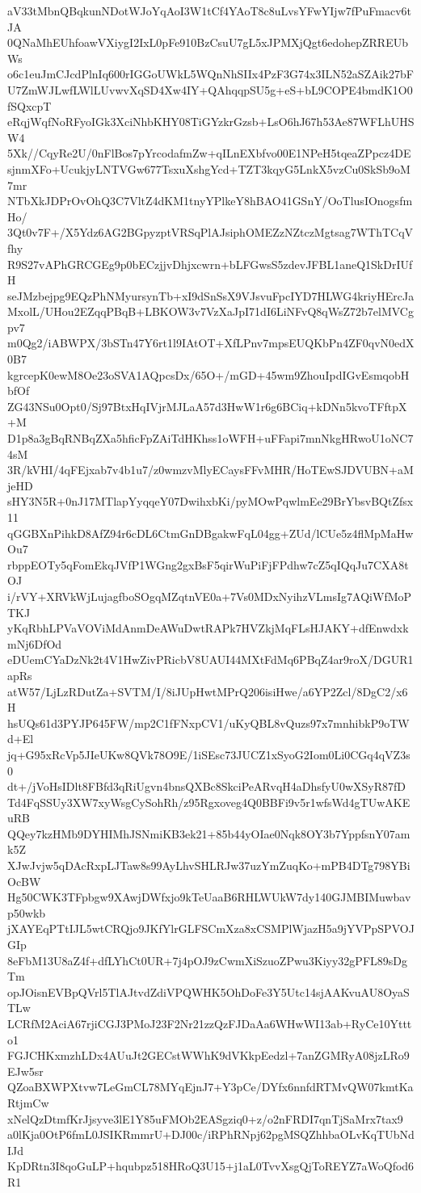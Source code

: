 aV33tMbnQBqkunNDotWJoYqAoI3W1tCf4YAoT8c8uLvsYFwYIjw7fPuFmacv6tJA
0QNaMhEUhfoawVXiygI2IxL0pFe910BzCsuU7gL5xJPMXjQgt6edohepZRREUbWs
o6c1euJmCJcdPlnIq600rIGGoUWkL5WQnNhSIIx4PzF3G74x3ILN52aSZAik27bF
U7ZmWJLwfLWlLUvwvXqSD4Xw4IY+QAhqqpSU5g+eS+bL9COPE4bmdK1O0fSQxcpT
eRqjWqfNoRFyoIGk3XciNhbKHY08TiGYzkrGzsb+LsO6hJ67h53Ae87WFLhUHSW4
5Xk//CqyRe2U/0nFlBos7pYrcodafmZw+qILnEXbfvo00E1NPeH5tqeaZPpcz4DE
sjnmXFo+UcukjyLNTVGw677TsxuXshgYcd+TZT3kqyG5LnkX5vzCu0SkSb9oM7mr
NTbXkJDPrOvOhQ3C7VltZ4dKM1tnyYPlkeY8hBAO41GSnY/OoTlusIOnogsfmHo/
3Qt0v7F+/X5Ydz6AG2BGpyzptVRSqPlAJsiphOMEZzNZtczMgtsag7WThTCqVfhy
R9S27vAPhGRCGEg9p0bECzjjvDhjxcwrn+bLFGwsS5zdevJFBL1aneQ1SkDrIUfH
seJMzbejpg9EQzPhNMyursynTb+xI9dSnSsX9VJsvuFpcIYD7HLWG4kriyHErcJa
MxolL/UHou2EZqqPBqB+LBKOW3v7VzXaJpI71dI6LiNFvQ8qWsZ72b7elMVCgpv7
m0Qg2/iABWPX/3bSTn47Y6rt1l9IAtOT+XfLPnv7mpsEUQKbPn4ZF0qvN0edX0B7
kgrcepK0ewM8Oe23oSVA1AQpcsDx/65O+/mGD+45wm9ZhouIpdIGvEsmqobHbfOf
ZG43NSu0Opt0/Sj97BtxHqIVjrMJLaA57d3HwW1r6g6BCiq+kDNn5kvoTFftpX+M
D1p8a3gBqRNBqZXa5hficFpZAiTdHKhss1oWFH+uFFapi7mnNkgHRwoU1oNC74sM
3R/kVHI/4qFEjxab7v4b1u7/z0wmzvMlyECaysFFvMHR/HoTEwSJDVUBN+aMjeHD
sHY3N5R+0nJ17MTlapYyqqeY07DwihxbKi/pyMOwPqwlmEe29BrYbsvBQtZfsx11
qGGBXnPihkD8AfZ94r6cDL6CtmGnDBgakwFqL04gg+ZUd/lCUe5z4flMpMaHwOu7
rbppEOTy5qFomEkqJVfP1WGng2gxBsF5qirWuPiFjFPdhw7cZ5qIQqJu7CXA8tOJ
i/rVY+XRVkWjLujagfboSOgqMZqtnVE0a+7Vs0MDxNyihzVLmsIg7AQiWfMoPTKJ
yKqRbhLPVaVOViMdAnmDeAWuDwtRAPk7HVZkjMqFLsHJAKY+dfEnwdxkmNj6DfOd
eDUemCYaDzNk2t4V1HwZivPRicbV8UAUI44MXtFdMq6PBqZ4ar9roX/DGUR1apRs
atW57/LjLzRDutZa+SVTM/I/8iJUpHwtMPrQ206isiHwe/a6YP2Zcl/8DgC2/x6H
hsUQs61d3PYJP645FW/mp2C1fFNxpCV1/uKyQBL8vQuzs97x7mnhibkP9oTWd+El
jq+G95xRcVp5JIeUKw8QVk78O9E/1iSEsc73JUCZ1xSyoG2Iom0Li0CGq4qVZ3s0
dt+/jVoHsIDlt8FBfd3qRiUgvn4bnsQXBc8SkciPeARvqH4aDhsfyU0wXSyR87fD
Td4FqSSUy3XW7xyWsgCySohRh/z95Rgxoveg4Q0BBFi9v5r1wfsWd4gTUwAKEuRB
QQey7kzHMb9DYHIMhJSNmiKB3ek21+85b44yOIae0Nqk8OY3b7YppfsnY07amk5Z
XJwJvjw5qDAcRxpLJTaw8s99AyLhvSHLRJw37uzYmZuqKo+mPB4DTg798YBiOcBW
Hg50CWK3TFpbgw9XAwjDWfxjo9kTeUaaB6RHLWUkW7dy140GJMBIMuwbavp50wkb
jXAYEqPTtIJL5wtCRQjo9JKfYlrGLFSCmXza8xCSMPlWjazH5a9jYVPpSPVOJGIp
8eFbM13U8aZ4f+dfLYhCt0UR+7j4pOJ9zCwmXiSzuoZPwu3Kiyy32gPFL89sDgTm
opJOisnEVBpQVrl5TlAJtvdZdiVPQWHK5OhDoFe3Y5Utc14sjAAKvuAU8OyaSTLw
LCRfM2AciA67rjiCGJ3PMoJ23F2Nr21zzQzFJDaAa6WHwWI13ab+RyCe10Yttto1
FGJCHKxmzhLDx4AUuJt2GECstWWhK9dVKkpEedzl+7anZGMRyA08jzLRo9EJw5sr
QZoaBXWPXtvw7LeGmCL78MYqEjnJ7+Y3pCe/DYfx6nnfdRTMvQW07kmtKaRtjmCw
xNelQzDtmfKrJjsyve3lE1Y85uFMOb2EASgziq0+z/o2nFRDI7qnTjSaMrx7tax9
a0lKja0OtP6fmL0JSIKRmmrU+DJ00c/iRPhRNpj62pgMSQZhhbaOLvKqTUbNdIJd
KpDRtn3I8qoGuLP+hqubpz518HRoQ3U15+j1aL0TvvXsgQjToREYZ7aWoQfod6R1
